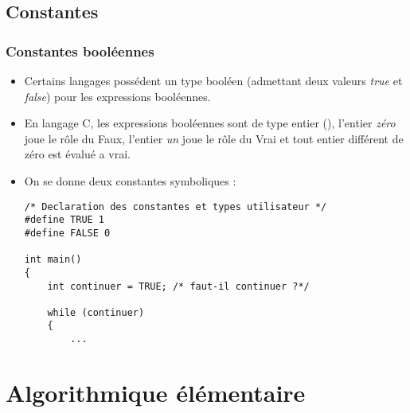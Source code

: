 \documentclass[xcolor=pdftex,svgnames,table]{beamer}
\begin{document}
\subsection{Constantes}
\begin{frame}[fragile]
  \frametitle{Constantes booléennes}
  \begin{itemize}
    \item
 Certains langages possédent un type booléen (admettant deux
  valeurs \emph{true} et \emph{false}) pour les expressions
  booléennes.\pause

\item En langage C, les
  expressions booléennes sont de type entier (), l'entier \emph{zéro}
  joue le rôle du Faux, l'entier \emph{un} joue le rôle du Vrai et tout
  entier différent de zéro est évalué a vrai.\pause

\item On se donne deux
  constantes symboliques :
\begin{lstlisting}[escapechar={\%},basicstyle=\scriptsize\ttfamily]
/* Declaration des constantes et types utilisateur */
#define TRUE 1
#define FALSE 0

int main()
{
    int continuer = TRUE; /* faut-il continuer ?*/

    while (continuer)
    {
        ...
\end{lstlisting}

  \end{itemize}
\end{frame}


\section{Algorithmique élémentaire}
\end{document}

